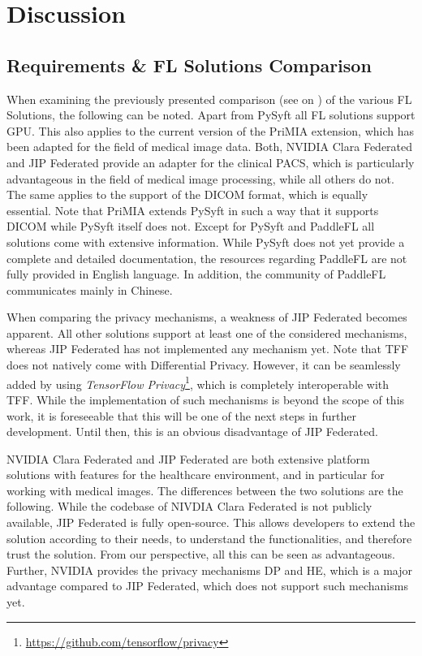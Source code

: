\section{Discussion}
\label{sec:Discussion}

\subsection{Requirements \& FL Solutions Comparison}
\label{subsec:DiscussionRequirements}

When examining the previously presented comparison (see  on \pageref{subsec:ResultsRequirements}) of the various FL Solutions, the following can be noted.
Apart from PySyft all FL solutions support GPU. This also applies to the current version of the PriMIA extension, which has been adapted for the field of medical image data.
Both, NVIDIA Clara Federated and JIP Federated provide an adapter for the clinical PACS, which is particularly advantageous in the field of medical image processing, while all others do not. The same applies to the support of the DICOM format, which is equally essential.
Note that PriMIA extends PySyft in such a way that it supports DICOM while PySyft itself does not.
Except for PySyft and PaddleFL all solutions come with extensive information. While PySyft does not yet provide a complete and detailed documentation, the resources regarding PaddleFL are not fully provided in English language. In addition, the community of PaddleFL communicates mainly in Chinese.

When comparing the privacy mechanisms, a weakness of JIP Federated becomes apparent. All other solutions support at least one of the considered mechanisms, whereas JIP Federated has not implemented any mechanism yet.
Note that TFF does not natively come with Differential Privacy. However, it can be seamlessly added by using \textit{TensorFlow Privacy}\footnote{\url{https://github.com/tensorflow/privacy}}, which is completely interoperable with TFF.
While the implementation of such mechanisms is beyond the scope of this work, it is foreseeable that this will be one of the next steps in further development. %
Until then, this is an obvious disadvantage of JIP Federated.

NVIDIA Clara Federated and JIP Federated are both extensive platform solutions with features for the healthcare environment, and in particular for working with medical images.
The differences between the two solutions are the following. While the codebase of NIVDIA Clara Federated is not publicly available, JIP Federated is fully open-source. This allows developers to extend the solution according to their needs, to understand the functionalities, and therefore trust the solution.
From our perspective, all this can be seen as advantageous.
Further, NVIDIA provides the privacy mechanisms DP and HE, which is a major advantage compared to JIP Federated, which does not support such mechanisms yet.

